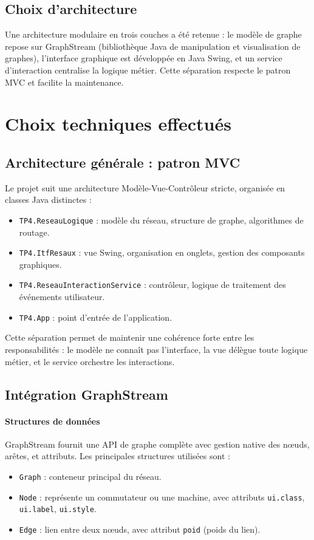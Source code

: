 \documentclass[12pt, a4paper]{article}
\begin{document}
\subsection{Choix d'architecture}

Une architecture modulaire en trois couches a été retenue : le modèle de graphe repose sur GraphStream (bibliothèque Java de manipulation et visualisation de graphes), l'interface graphique est développée en Java Swing, et un service d'interaction centralise la logique métier. Cette séparation respecte le patron MVC et facilite la maintenance.

\section{Choix techniques effectués}

\subsection{Architecture générale : patron MVC}

Le projet suit une architecture Modèle-Vue-Contrôleur stricte, organisée en classes Java distinctes :
\begin{itemize}
    \item \texttt{TP4.ReseauLogique} : modèle du réseau, structure de graphe, algorithmes de routage.
    \item \texttt{TP4.ItfResaux} : vue Swing, organisation en onglets, gestion des composants graphiques.
    \item \texttt{TP4.ReseauInteractionService} : contrôleur, logique de traitement des événements utilisateur.
    \item \texttt{TP4.App} : point d'entrée de l'application.
\end{itemize}

Cette séparation permet de maintenir une cohérence forte entre les responsabilités : le modèle ne connaît pas l'interface, la vue délègue toute logique métier, et le service orchestre les interactions.

\subsection{Intégration GraphStream}

\paragraph{Structures de données}
GraphStream fournit une API de graphe complète avec gestion native des nœuds, arêtes, et attributs. Les principales structures utilisées sont :
\begin{itemize}
    \item \texttt{Graph} : conteneur principal du réseau.
    \item \texttt{Node} : représente un commutateur ou une machine, avec attributs \texttt{ui.class}, \texttt{ui.label}, \texttt{ui.style}.
    \item \texttt{Edge} : lien entre deux nœuds, avec attribut \texttt{poid} (poids du lien).
\end{itemize}
\end{document}
